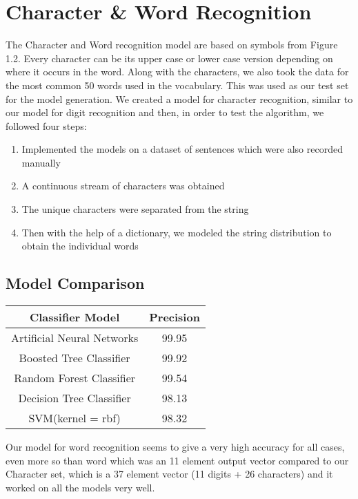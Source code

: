 \section{Character \& Word Recognition}
 The Character and Word recognition model are based on symbols from Figure 1.2. Every character can be its upper case or lower case version depending on where it occurs in the word. Along with the characters, we also took the data for the most common 50 words used in the vocabulary. This was used as our test set for the model generation. We created a model for character recognition, similar to our model for digit recognition and then, in order to test the algorithm, we followed four steps:
 \begin{enumerate}
\item Implemented the models on a dataset of sentences which were also recorded manually
\item A continuous stream of characters was obtained
\item The unique characters were separated from the string
\item Then with the help of a dictionary, we modeled the string distribution to obtain the individual words
\end{enumerate}

\subsection{Model Comparison}

\begin{table}[!h]
\begin{center}
\begin{tabular}{| c | c |}
\hline
\textbf{Classifier Model} & \textbf{Precision} \\
\hline
Artificial Neural Networks &  99.95 \\ \hline
Boosted Tree Classifier & 99.92 \\ \hline
Random Forest Classifier & 99.54 \\ \hline
Decision Tree Classifier & 98.13 \\ \hline
SVM(kernel = rbf) & 98.32 \\ \hline
\end{tabular}
\end{center}
\end{table}
Our model for word recognition seems to give a very high accuracy for all cases, even more so than word which was an 11 element output vector compared to our Character set, which is a 37 element vector (11 digits + 26 characters) and it worked on all the models very well.

